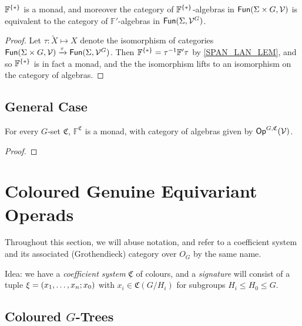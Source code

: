 \documentclass[a4paper,10pt
,draft
]{article}%
\newcommand{\UC}{\underline{\mathfrak C}}
\begin{document}
\begin{proposition}
      $\mathbb F^{\set{\**}}$ is a monad, and moreover
      the category of $\mathbb F^{\set{\**}}$-algebras in $\mathsf{Fun}(\Sigma \times G, \mathcal V)$ is equivalent to
      the category of $\mathbb F'$-algebras in $\mathsf{Fun}(\Sigma, \mathcal V^G)$.
\end{proposition}
\begin{proof}
      Let $\tau: \tilde X \mapsto X$ denote the isomorphism of categories
      $\mathsf{Fun}(\Sigma \times G, \mathcal V) \xrightarrow{\tau} \mathsf{Fun}(\Sigma, \mathcal V^G)$.
      Then $\mathbb F^{\set{\**}} = \tau^{-1} \mathbb F' \tau$ by \ref{SPAN_LAN_LEM}, and so
      $\mathbb F^{\set{\**}}$ is in fact a monad, and the
      the isomorphism lifts to an isomorphism on the category of algebras.
\end{proof}


\subsection{General Case}

\begin{theorem}
      For every $G$-set $\mathfrak C$, $\mathbb F^{\mathfrak C}$ is a monad, with category of algebras given by $\mathsf{Op}^{G,\mathfrak C}(\mathcal V)$. 
\end{theorem}
\begin{proof}
\end{proof}






\newpage

\section{Coloured Genuine Equivariant Operads}

Throughout this section, we will abuse notation, and refer to
a coefficient system and its associated (Grothendieck) category over $O_G$ by the same name.

Idea: we have a \textit{coefficient system} $\UC$ of colours, and
a \textit{signature} will consist of a tuple $\xi = (x_1, \dots, x_n;x_0)$
with $x_i \in \mathfrak C(G/H_i)$ for subgroups $H_i \leq H_0 \leq G$.

\subsection{Coloured $G$-Trees}
\end{document}
